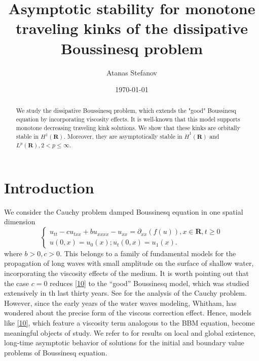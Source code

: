 \documentclass[12pt]{amsart}
\theoremstyle{definition}
\theoremstyle{remark}
\numberwithin{equation}{section}
\renewcommand{\(}{\left(}
\renewcommand{\)}{\right)}
\renewcommand{\[}{\left[}
\renewcommand{\]}{\right]}
\newcommand{\rone}{\mathbf R}
\newcommand{\p}{\partial}
\begin{document}
 
\title[Asymptotic stability for   traveling kinks of the   Boussinesq equation]
 {Asymptotic stability for monotone traveling kinks of the  dissipative  Boussinesq problem}





 
 
\author[Atanas Stefanov]{\sc Atanas Stefanov}
\address{ }




\date{\today}


\begin{abstract}
  We study the dissipative Boussinesq problem, which extends the "good" Boussinesq equation by incorporating viscosity effects. It is well-known that this model supports monotone decreasing traveling kink solutions. We show that these kinks are orbitally stable in $H^1(\rone)$. Moreover, they are  asymptotically stable in $\dot{H}^1(\rone)$ and $L^p(\rone), 2<p\leq \infty$. 
\end{abstract}

\maketitle



\section{Introduction}
  We consider the Cauchy problem damped Boussinesq equation in one spatial dimension
  \begin{equation}
  	\label{10} 
  	\begin{cases}
  		u_{tt}- c u_{txx}+b u_{xxxx} - u_{xx}= \p_{xx} (f(u)), x\in \rone, t\geq 0 \\
  		u(0,x)=u_0(x);  u_t(0,x)=u_1(x).
  	\end{cases}
  	 \end{equation}
  where $b>0, c>0$. This belongs to a family of fundamental models for the propagation of long waves with small amplitude on the surface of shallow water, incorporating the viscosity effects of the medium. It is worth pointing out that the case $c=0$ reduces \eqref{10} to the ``good'' Boussinesq model, which was studied extensively in th last thirty years.  See \cite{TM} for the analysis of the Cauchy problem. However,  since the  early years of the water waves modeling, Whitham, \cite{Wh}  has wondered about  the precise form of the viscous correction effect. Hence, models like \eqref{10}, which feature a viscosity term analogous to the BBM equation, become meaningful objects of study. We refer to \cite{Liu1, Liu2, MPP, OC} for  results on local and global existence, long-time asymptotic behavior of solutions for the initial and  boundary value problems of Boussinesq equation.
  
\end{document}
